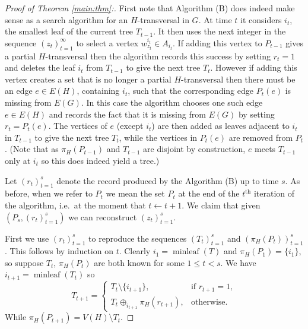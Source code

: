 \documentclass[12]{article}
\def\tr{\textrm}
\DeclareMathOperator{\minl}{minleaf}
\begin{document}
\begin{proof}[Proof of Theorem \ref{main:thm}:]
First note that Algorithm (B) does indeed make sense as a search algorithm for an $H$-transversal in $G$. At time $t$ it considers $i_t$, the smallest leaf of the current tree $T_{t-1}$. It then uses the next integer in the sequence $(z_{t})_{t=1}^\infty$  to select a vertex  $w_{z_t}^{i_t}\in A_{i_t}$. If adding this vertex to $P_{t-1}$ gives a partial $H$-transversal then the algorithm records this success by setting $r_t=1$ and deletes the leaf $i_t$ from $T_{t-1}$ to give the next tree $T_t$. However if adding this vertex creates a set that is no longer a partial $H$-transversal then there must be an edge  $e\in E(H)$, containing $i_t$, such that the corresponding edge $P_t(e)$ is missing from $E(G)$. In this case the algorithm chooses one such edge $e\in E(H)$ and records the fact that it is missing from $E(G)$ by setting $r_t=P_t(e)$. The vertices of $e$ (except $i_t$) are then added as leaves adjacent to $i_t$ in $T_{t-1}$ to give the next tree $T_t$, while the vertices in $P_t(e)$  are removed from $P_t$. (Note that as $\pi_H(P_{t-1})$ and $T_{t-1}$ are disjoint by construction, $e$ meets $T_{t-1}$ only at $i_t$ so this does indeed yield a tree.)

 

Let $(r_t)_{t=1}^s$ denote the record produced by the Algorithm (B) up to time $s$. As before, when we refer to $P_t$ we mean the set $P_t$  at the end of the $t^\tr{th}$ iteration of the algorithm, i.e.~at the moment that $t\leftarrow t+1$. We claim that given $(P_s,(r_t)_{t=1}^s)$ we can reconstruct $(z_t)_{t=1}^s$.%
 
First we use $(r_t)_{t=1}^s$ to reproduce the sequences $(T_t)_{t=1}^s$ and $(\pi_H(P_t))_{t=1}^s$. This follows by induction on $t$. Clearly $i_1=\minl(T)$ and $\pi_H(P_1)=\{i_1\}$, so suppose $T_t$,  $\pi_H(P_t)$ are both known for some $1\leq t<s$. We have $i_{t+1}=\minl(T_t)$ so
\[
T_{t+1}=\left\{
\begin{array}{ll}
  T_t\setminus \{i_{t+1}\},& \textrm{if }r_{t+1}=1,\\
  T_{t}\oplus_{i_{t+1}}\pi_H(r_{t+1}),& \textrm{otherwise.} 
\end{array}\right.\]
While $\pi_H(P_{t+1})=V(H)\setminus T_t$.


\end{proof}
\end{document}
